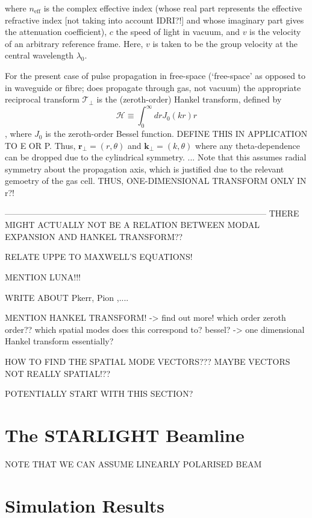 \documentclass[a4paper]{jpconf}
\begin{document}
where $n_\text{eff}$ is the complex effective index (whose real part represents the effective refractive index [not taking into account IDRI?!] and whose imaginary part gives the attenuation coefficient), $c$ the speed of light in vacuum, and $v$ is the velocity of an arbitrary reference frame. Here, $v$ is taken to be the group velocity at the central wavelength $\lambda_0$. \par 
For the present case of pulse propagation in free-space (`free-space' as opposed to in waveguide or fibre; does propagate through gas, not vacuum) the appropriate reciprocal transform $\mathcal{T}_\perp$ is the (zeroth-order) Hankel transform, defined by
\begin{equation}
\mathcal{H} \equiv \int_0^\infty dr J_0 (kr)r
\end{equation},
where $J_0$ is the zeroth-order Bessel function. DEFINE THIS IN APPLICATION TO E OR P. Thus, $\mathbf{r}_\perp = (r, \theta)$ and $\mathbf{k}_\perp = (k, \theta)$ where any theta-dependence can be dropped due to the cylindrical symmetry. 
...
Note that this assumes radial symmetry about the propagation axis, which is justified due to the relevant gemoetry of the gas cell. THUS, ONE-DIMENSIONAL TRANSFORM ONLY IN r?!

---------------------------------------------------------------------------------------------
THERE MIGHT ACTUALLY NOT BE A RELATION BETWEEN MODAL EXPANSION AND HANKEL TRANSFORM??


RELATE UPPE TO MAXWELL'S EQUATIONS!

MENTION LUNA!!!

WRITE ABOUT Pkerr, Pion ,....

MENTION HANKEL TRANSFORM! -> find out more! which order zeroth order?? which spatial modes does this correspond to? bessel? -> one dimensional Hankel transform essentially?

HOW TO FIND THE SPATIAL MODE VECTORS???
	MAYBE VECTORS NOT REALLY SPATIAL!??

POTENTIALLY START WITH THIS SECTION?

\section{The STARLIGHT Beamline}

NOTE THAT WE CAN ASSUME LINEARLY POLARISED BEAM

\section{Simulation Results}
\end{document}
